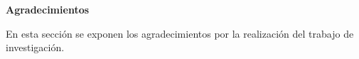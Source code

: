 \thispagestyle{plain}
\begin{center}
	\Large    
	\vspace{0.9cm}
	\textbf{Agradecimientos}
\end{center}
En esta sección se exponen los agradecimientos por la realización del trabajo de investigación.
